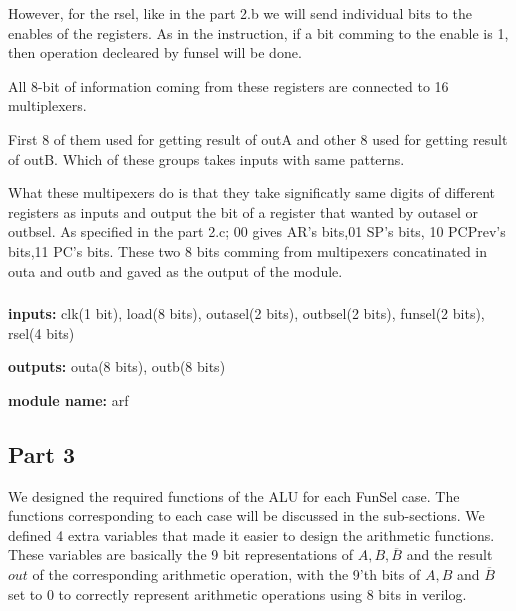 \documentclass[pdftex,12pt,a4paper]{article}
\begin{document}
However, for the rsel, like in the part 2.b we will send individual bits to the enables of
the registers. As in the instruction, if a bit comming to the enable is 1, then operation
decleared by funsel will be done.

All 8-bit of information coming from these registers are connected to 16 multiplexers.

First 8 of them used for getting result of outA and other 8 used for getting result of 
outB. Which of these groups takes inputs with same patterns.

What these multipexers do is that they take significatly same digits of different registers 
as inputs and output the bit of a register that wanted by outasel or outbsel. As specified
in the part 2.c; 00 gives AR's bits,01 SP's bits, 10 PCPrev's bits,11 PC's bits. 
These two 8 bits comming from multipexers concatinated in outa and outb and gaved as
the output of the module.

\subsubsection{}
\textbf{inputs:}    clk(1 bit),
load(8 bits),
outasel(2 bits),
outbsel(2 bits),
funsel(2 bits),
rsel(4 bits)

\textbf{outputs:}    
outa(8 bits),
outb(8 bits)

\textbf{module name:} arf

\subsection{Part 3}
We designed the required functions of the ALU for each FunSel case. The functions corresponding to each case will be discussed in the
sub-sections. We defined 4 extra variables that made it easier to design the arithmetic functions. These variables are basically the 9 
bit representations of $A, B, \overline{B}$ and the result $out$ of the corresponding arithmetic operation, with the 9'th bits of 
$A, B$ and $\overline{B}$ set to 0 to correctly represent arithmetic operations using 8 bits in verilog. 
\end{document}
